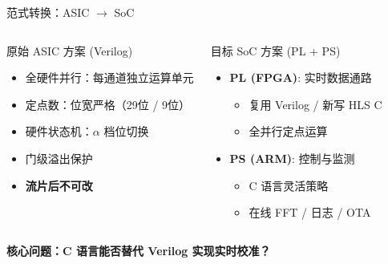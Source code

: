 \documentclass[table,UTF8,11pt,aspectratio=169]{beamer}
\begin{document}
\begin{frame}{范式转换：ASIC $\rightarrow$ SoC}
\begin{columns}[T]
\begin{block}{原始 ASIC 方案 (Verilog)}
\begin{itemize}
    \item 全硬件并行：每通道独立运算单元
    \item 定点数：位宽严格（29位 / 9位）
    \item 硬件状态机：$\alpha$ 档位切换
    \item 门级溢出保护
    \item \textbf{流片后不可改}
\end{itemize}
\end{block}

\begin{block}{目标 SoC 方案 (PL + PS)}
\begin{itemize}
    \item \textbf{PL (FPGA)}: 实时数据通路
    \begin{itemize}
        \item 复用 Verilog / 新写 HLS C
        \item 全并行定点运算
    \end{itemize}
    \item \textbf{PS (ARM)}: 控制与监测
    \begin{itemize}
        \item C 语言灵活策略
        \item 在线 FFT / 日志 / OTA
    \end{itemize}
\end{itemize}
\end{block}
\end{columns}

\vspace{0.3cm}
\centering
\textbf{核心问题：C 语言能否替代 Verilog 实现实时校准？}
\end{frame}
\end{document}
